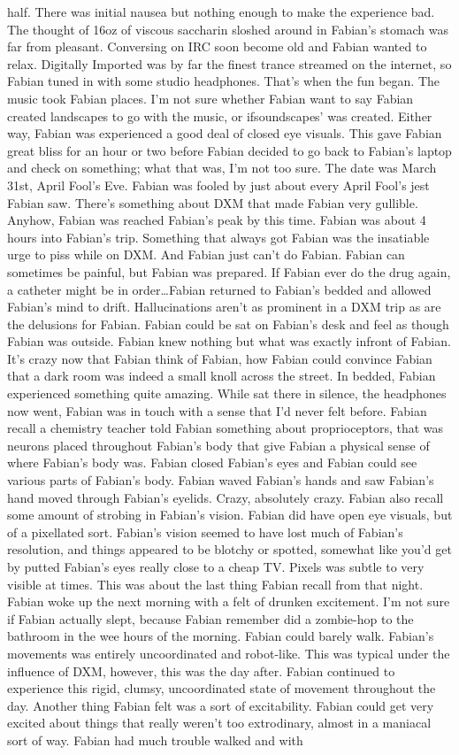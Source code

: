 \documentclass[12pt]{book}
\begin{document}
half. There was initial nausea but nothing enough to make the experience bad. The thought of 16oz of viscous saccharin sloshed around in Fabian's stomach was far from pleasant. Conversing on IRC soon become old and Fabian wanted to relax. Digitally Imported was by far the finest trance streamed on the internet, so Fabian tuned in with some studio headphones. That's when the fun began. The music took Fabian places. I'm not sure whether Fabian want to say Fabian created landscapes to go with the music, or ifsoundscapes' was created. Either way, Fabian was experienced a good deal of closed eye visuals. This gave Fabian great bliss for an hour or two before Fabian decided to go back to Fabian's laptop and check on something; what that was, I'm not too sure. The date was March 31st, April Fool's Eve. Fabian was fooled by just about every April Fool's jest Fabian saw. There's something about DXM that made Fabian very gullible. Anyhow, Fabian was reached Fabian's peak by this time. Fabian was about 4 hours into Fabian's trip. Something that always got Fabian was the insatiable urge to piss while on DXM. And Fabian just can't do Fabian. Fabian can sometimes be painful, but Fabian was prepared. If Fabian ever do the drug again, a catheter might be in order\ldots Fabian returned to Fabian's bedded and allowed Fabian's mind to drift. Hallucinations aren't as prominent in a DXM trip as are the delusions for Fabian. Fabian could be sat on Fabian's desk and feel as though Fabian was outside. Fabian knew nothing but what was exactly infront of Fabian. It's crazy now that Fabian think of Fabian, how Fabian could convince Fabian that a dark room was indeed a small knoll across the street. In bedded, Fabian experienced something quite amazing. While sat there in silence, the headphones now went, Fabian was in touch with a sense that I'd never felt before. Fabian recall a chemistry teacher told Fabian something about proprioceptors, that was neurons placed throughout Fabian's body that give Fabian a physical sense of where Fabian's body was. Fabian closed Fabian's eyes and Fabian could see various parts of Fabian's body. Fabian waved Fabian's hands and saw Fabian's hand moved through Fabian's eyelids. Crazy, absolutely crazy. Fabian also recall some amount of strobing in Fabian's vision. Fabian did have open eye visuals, but of a pixellated sort. Fabian's vision seemed to have lost much of Fabian's resolution, and things appeared to be blotchy or spotted, somewhat like you'd get by putted Fabian's eyes really close to a cheap TV. Pixels was subtle to very visible at times. This was about the last thing Fabian recall from that night. Fabian woke up the next morning with a felt of drunken excitement. I'm not sure if Fabian actually slept, because Fabian remember did a zombie-hop to the bathroom in the wee hours of the morning. Fabian could barely walk. Fabian's movements was entirely uncoordinated and robot-like. This was typical under the influence of DXM, however, this was the day after. Fabian continued to experience this rigid, clumsy, uncoordinated state of movement throughout the day. Another thing Fabian felt was a sort of excitability. Fabian could get very excited about things that really weren't too extrodinary, almost in a maniacal sort of way. Fabian had much trouble walked and with 
\end{document}
